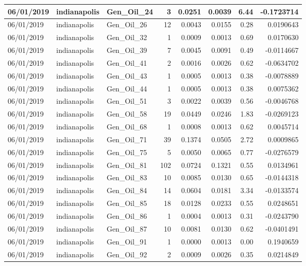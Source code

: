 \documentclass[
  letterpaper,
  DIV=11,
  numbers=noendperiod]{scrartcl}
\begin{document}
\begin{tabular}{l|l|l|r|r|r|r|r}
\hline
06/01/2019 & indianapolis & Gen\_Oil\_24 & 3 & 0.0251 & 0.0039 & 6.44 & -0.1723714\\
\hline
06/01/2019 & indianapolis & Gen\_Oil\_26 & 12 & 0.0043 & 0.0155 & 0.28 & 0.0190643\\
\hline
06/01/2019 & indianapolis & Gen\_Oil\_32 & 1 & 0.0009 & 0.0013 & 0.69 & 0.0170630\\
\hline
06/01/2019 & indianapolis & Gen\_Oil\_39 & 7 & 0.0045 & 0.0091 & 0.49 & -0.0114667\\
\hline
06/01/2019 & indianapolis & Gen\_Oil\_41 & 2 & 0.0016 & 0.0026 & 0.62 & -0.0634702\\
\hline
06/01/2019 & indianapolis & Gen\_Oil\_43 & 1 & 0.0005 & 0.0013 & 0.38 & -0.0078889\\
\hline
06/01/2019 & indianapolis & Gen\_Oil\_44 & 1 & 0.0005 & 0.0013 & 0.38 & 0.0075362\\
\hline
06/01/2019 & indianapolis & Gen\_Oil\_51 & 3 & 0.0022 & 0.0039 & 0.56 & -0.0046768\\
\hline
06/01/2019 & indianapolis & Gen\_Oil\_58 & 19 & 0.0449 & 0.0246 & 1.83 & -0.0269123\\
\hline
06/01/2019 & indianapolis & Gen\_Oil\_68 & 1 & 0.0008 & 0.0013 & 0.62 & 0.0045714\\
\hline
06/01/2019 & indianapolis & Gen\_Oil\_71 & 39 & 0.1374 & 0.0505 & 2.72 & 0.0009865\\
\hline
06/01/2019 & indianapolis & Gen\_Oil\_75 & 5 & 0.0050 & 0.0065 & 0.77 & -0.0276579\\
\hline
06/01/2019 & indianapolis & Gen\_Oil\_81 & 102 & 0.0724 & 0.1321 & 0.55 & 0.0134961\\
\hline
06/01/2019 & indianapolis & Gen\_Oil\_83 & 10 & 0.0085 & 0.0130 & 0.65 & -0.0144318\\
\hline
06/01/2019 & indianapolis & Gen\_Oil\_84 & 14 & 0.0604 & 0.0181 & 3.34 & -0.0133574\\
\hline
06/01/2019 & indianapolis & Gen\_Oil\_85 & 18 & 0.0128 & 0.0233 & 0.55 & 0.0248651\\
\hline
06/01/2019 & indianapolis & Gen\_Oil\_86 & 1 & 0.0004 & 0.0013 & 0.31 & -0.0243790\\
\hline
06/01/2019 & indianapolis & Gen\_Oil\_87 & 10 & 0.0081 & 0.0130 & 0.62 & -0.0401491\\
\hline
06/01/2019 & indianapolis & Gen\_Oil\_91 & 1 & 0.0000 & 0.0013 & 0.00 & 0.1940659\\
\hline
06/01/2019 & indianapolis & Gen\_Oil\_92 & 2 & 0.0009 & 0.0026 & 0.35 & 0.0214849\\

\end{tabular}
\end{document}
